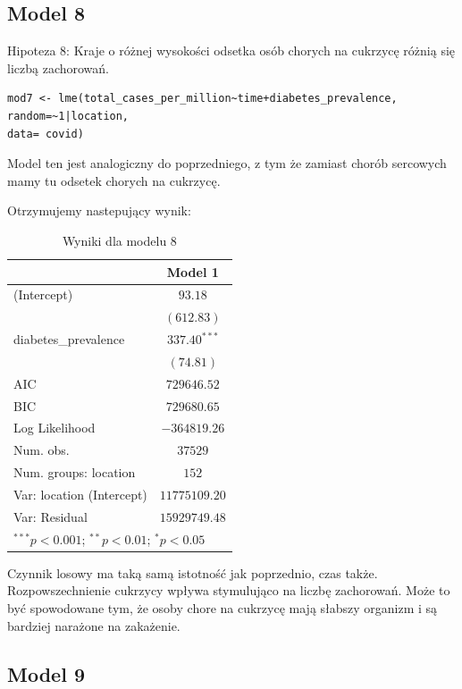\documentclass[12pt]{mwbk}
\theoremstyle{plain}
\theoremstyle{definition}
\theoremstyle{remark}
\begin{document}
\subsection{Model 8}

Hipoteza 8: Kraje o różnej wysokości odsetka osób chorych na cukrzycę różnią się liczbą zachorowań.

\begin{verbatim}
mod7 <- lme(total_cases_per_million~time+diabetes_prevalence,
random=~1|location,
data= covid)
\end{verbatim}

Model ten jest analogiczny do poprzedniego, z tym że zamiast chorób sercowych mamy tu odsetek chorych na cukrzycę.

Otrzymujemy nastepujący wynik:
\begin{table}
	\begin{center}
		\begin{tabular}{l c}
			\hline
			& Model 1 \\
			\hline
			(Intercept)               & $93.18$        \\
			& $(612.83)$     \\
			diabetes\_prevalence      & $337.40^{***}$ \\
			& $(74.81)$      \\
			\hline
			AIC                       & $729646.52$    \\
			BIC                       & $729680.65$    \\
			Log Likelihood            & $-364819.26$   \\
			Num. obs.                 & $37529$        \\
			Num. groups: location     & $152$          \\
			Var: location (Intercept) & $11775109.20$  \\
			Var: Residual             & $15929749.48$  \\
			\hline
			\multicolumn{2}{l}{\scriptsize{$^{***}p<0.001$; $^{**}p<0.01$; $^{*}p<0.05$}}
		\end{tabular}
		\caption{Wyniki dla modelu 8}
		\label{table:model8}
	\end{center}
\end{table}

Czynnik losowy ma taką samą istotność jak poprzednio, czas także. Rozpowszechnienie cukrzycy wpływa stymulująco na liczbę zachorowań. Może to być spowodowane tym, że osoby chore na cukrzycę mają słabszy organizm i są bardziej narażone na zakażenie.
\subsection{Model 9}
\end{document}
